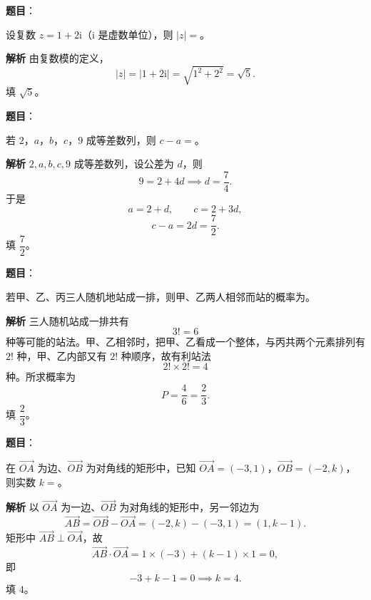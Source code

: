 \begin{answer}

\textbf{题目}：

设复数 $z=1+2\mathrm i$（$\mathrm i$ 是虚数单位），则 $|z|=$\gkblank{}。

\textbf{解析}
由复数模的定义，
\nopagebreak[4]
\[|z|=|1+2\mathrm i|=\sqrt{1^2+2^2}=\sqrt5.\]
填 $\sqrt5$。


\end{answer}
\begin{answer}

\textbf{题目}：

若 $2$，$a$，$b$，$c$，$9$ 成等差数列，则 $c-a=$\gkblank{}。

\textbf{解析}
$2,a,b,c,9$ 成等差数列，设公差为 $d$，则
\nopagebreak[4]
\[9=2+4d\implies d=\frac74.\]
于是
\nopagebreak[4]
\[a=2+d,\qquad c=2+3d,\]
\nopagebreak[4]
\[c-a=2d=\frac72.\]
填 $\dfrac72$。


\end{answer}
\begin{answer}

\textbf{题目}：

若甲、乙、丙三人随机地站成一排，则甲、乙两人相邻而站的概率为\gkblank{}。

\textbf{解析}
三人随机站成一排共有
\nopagebreak[4]
\[3!=6\]
种等可能的站法。甲、乙相邻时，把甲、乙看成一个整体，与丙共两个元素排列有 $2!$ 种，甲、乙内部又有 $2!$ 种顺序，故有利站法
\nopagebreak[4]
\[2!\times2!=4\]
种。所求概率为
\nopagebreak[4]
\[P=\frac46=\frac23.\]
填 $\dfrac23$。


\end{answer}
\begin{answer}

\textbf{题目}：

在 $\overrightarrow{OA}$ 为边、$\overrightarrow{OB}$ 为对角线的矩形中，已知 $\overrightarrow{OA}=(-3,1)$，$\overrightarrow{OB}=(-2,k)$，则实数 $k=$\gkblank{}。

\textbf{解析}
以 $\overrightarrow{OA}$ 为一边、$\overrightarrow{OB}$ 为对角线的矩形中，另一邻边为
\nopagebreak[4]
\[\overrightarrow{AB}=\overrightarrow{OB}-\overrightarrow{OA}=(-2,k)-(-3,1)=(1,k-1).\]
矩形中 $\overrightarrow{AB}\perp\overrightarrow{OA}$，故
\nopagebreak[4]
\[\overrightarrow{AB}\cdot\overrightarrow{OA}=1\times(-3)+(k-1)\times1=0,\]
即
\nopagebreak[4]
\[-3+k-1=0\implies k=4.\]
填 $4$。


\end{answer}
